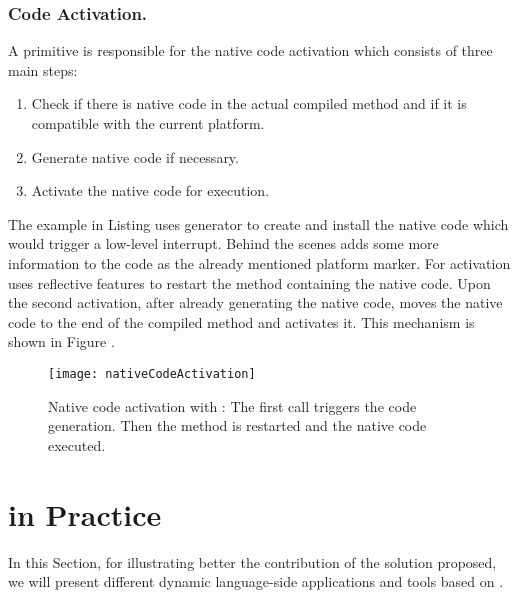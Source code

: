 \subsubsection{Code Activation.}
 
A \B primitive is responsible for the native code activation which consists of three main steps:
%
\begin{enumerate}
	\item Check if there is native code in the actual compiled method and if it is compatible with the current platform.
	\item Generate native code if necessary.
	\item Activate the native code for execution.
\end{enumerate}
%
The example in Listing  uses \Bs generator to create and install the native code which would trigger a low-level interrupt. Behind the scenes \B adds some more information to the code as the already mentioned platform marker. 
For activation \B uses reflective features to restart the method containing the native code.
Upon the second activation, after already generating the native code, \B moves the native code to the end of the compiled method and activates it.
This mechanism is shown in Figure .

\begin{figure}[ht]
	\centering
	\texttt{[image: nativeCodeActivation]}
	\caption{Native code activation with \B: The first call triggers the code generation. Then the method is restarted and the native code executed.}
\end{figure}

\newpage
\section{\B in Practice}

In this Section, for illustrating better the contribution of the solution proposed, we will present different dynamic language-side applications and tools based on \B.

